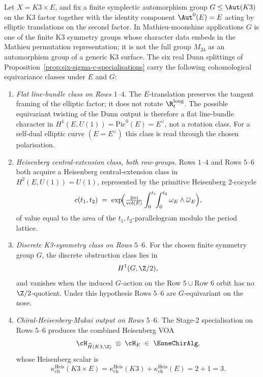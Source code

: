 \begin{theorem}
\label{thm:aut-equivariant-dunn-k3xe}
Let \(X=K3\times E\), and fix a finite symplectic automorphism group
\(G\leq \Aut(K3)\) on the K3 factor together with the identity component
\(\Aut^0(E)=E\) acting by elliptic translations on the second factor.
In Mathieu-moonshine applications \(G\) is one of the finite K3 symmetry
groups whose character data embeds in the Mathieu permutation
representation; it is not the full group \(M_{24}\) as an automorphism
group of a generic K3 surface.  The six real Dunn splittings of
Proposition~\ref{prop:six-sigma-c-specialisations} carry the following
cohomological equivariance classes under \(E\) and \(G\):
\begin{enumerate}[label=(\roman*)]
\item \emph{Flat line-bundle class on Rows $1$--$4$.} The \(E\)-translation preserves the tangent framing of the elliptic factor; it does not rotate \(\R_t^{\mathrm{long}}\).  The possible equivariant twisting of the Dunn output is therefore a flat line-bundle character in \(H^1(E,U(1))=\mathrm{Pic}^0(E)=E^\vee\), not a rotation class.  For a self-dual elliptic curve \((E=E^\vee)\) this class is read through the chosen polarisation.
\item \emph{Heisenberg central-extension class, both row-groups.} Rows $1$--$4$ and Rows $5$--$6$ both acquire a Heisenberg central-extension class in $H^2(E, U(1)) = U(1)$, represented by the primitive Heisenberg $2$-cocycle
\[
 c(t_1, t_2) \;=\; \exp\!\Bigl(\tfrac{2\pi i}{\operatorname{vol}(E)} \int_0^{t_1}\!\!\int_0^{t_2} \omega_E \wedge \overline\omega_E\Bigr),
\]
of value equal to the area of the $t_1, t_2$-parallelogram modulo the period lattice.
\item \emph{Discrete K3-symmetry class on Rows $5$--$6$.} For the chosen finite symmetry group \(G\), the discrete obstruction class lies in
\[
 H^1(G,\Z/2),
\]
and vanishes when the induced \(G\)-action on the Row \(5\cup\)Row \(6\)
orbit has no \(\Z/2\)-quotient.  Under this hypothesis Rows \(5\)--\(6\)
are \(G\)-equivariant on the nose.
\item \emph{Chiral-Heisenberg-Mukai output on Rows $5$--$6$.} The Stage-$2$ specialisation on Rows $5$--$6$ produces the combined Heisenberg VOA
\[
 \cH_{\widetilde H(K3, \Z)} \;\otimes\; \cH_E
 \;\in\; \EoneChirAlg,
\]
whose Heisenberg scalar is
\[
 \kappa_{\mathrm{ch}}^{\mathrm{Heis}}(K3\times E)
 =
 \kappa_{\mathrm{ch}}^{\mathrm{Heis}}(K3)+\kappa_{\mathrm{ch}}^{\mathrm{Heis}}(E)
 =
 2+1=3.
\]
\end{enumerate}
\end{theorem}

